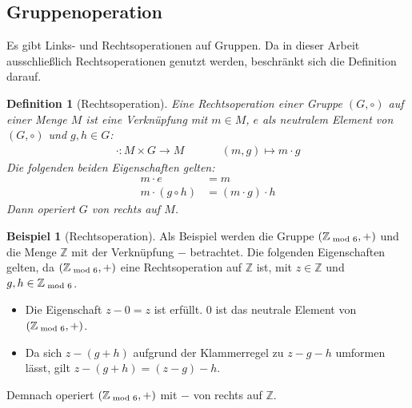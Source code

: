 \documentclass[12pt,a4paper, usenames, dvipsnames]{article}
\theoremstyle{mystyle}
\newtheorem{definition}{Definition}
\theoremstyle{definition}
\newtheorem{bsp}{Beispiel}[definition]
\begin{document}
%
%
%
%
%
%
%
%
%
%

\subsection{Gruppenoperation}
 \label{Abschnitt_Gruppenoperation}



Es gibt Links- und Rechtsoperationen auf Gruppen. Da in dieser Arbeit ausschließlich Rechtsoperationen genutzt werden, beschränkt sich die Definition darauf.


\begin{definition}[Rechtsoperation]

Eine Rechtsoperation einer Gruppe $(G, \circ)$ auf einer Menge $M$ ist eine Verknüpfung mit $m \in M$, $e$ als neutralem Element von $(G,\circ)$ und $g,h \in G$:
\begin{align*}
\cdot: M \times G \rightarrow M \ \ \ \ \ \ \ \ \ \ \ \ \ \ \
(m, g) \mapsto m \cdot g 
\end{align*}
Die folgenden beiden Eigenschaften gelten:
\begin{align*}
m \cdot e & = m \\
m \cdot (g \circ h) & = (m \cdot g) \cdot h
\end{align*}
Dann operiert $G$ von rechts auf $M$.

\end{definition}


\begin{bsp}[Rechtsoperation]

Als Beispiel werden die Gruppe $(\mathbb{Z}_{\hspace*{-0.3em}\mod 6}, +)$ und die Menge $\mathbb{Z}$ mit der Verknüpfung $-$ betrachtet. Die folgenden Eigenschaften gelten, da $(\mathbb{Z}_{\hspace*{-0.3em}\mod 6}, +)$ eine Rechtsoperation auf $\mathbb{Z}$ ist, mit $z \in  \mathbb{Z}$ und $g,h \in \mathbb{Z}_{\hspace*{-0.3em}\mod 6}$.
\begin{itemize}
\item Die Eigenschaft $z - 0 = z$ ist erfüllt. $0$ ist das neutrale Element von $(\mathbb{Z}_{\hspace*{-0.3em}\mod 6}, +)$.
\item Da sich $z-(g+h)$ aufgrund der Klammerregel zu $z-g-h$ umformen lässt, gilt $z-(g+h) = (z-g)-h$.
\end{itemize}
Demnach operiert $(\mathbb{Z}_{\hspace*{-0.3em}\mod 6}, +)$ mit $-$ von rechts auf $\mathbb{Z}$.

\end{bsp}
\end{document}
